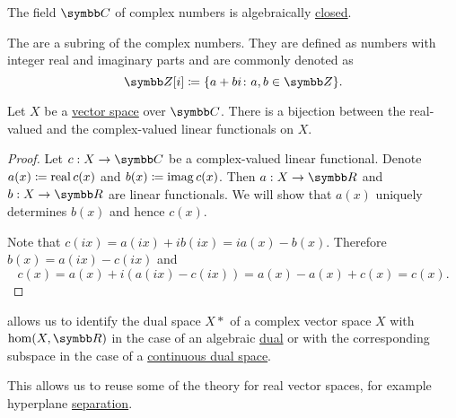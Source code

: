 \begin{theorem}\label{thm:fundamental_theorem_of_algebra}
  The field \( \BC \) of complex numbers is algebraically \hyperref[def:algebraically_closed_field]{closed}.
\end{theorem}

\begin{definition}\label{def:gaussian_integers}
  The  are a subring of the complex numbers. They are defined as numbers with integer real and imaginary parts and are commonly denoted as
  \begin{equation*}
    \BZ[i] \coloneqq \{ a + bi \colon a, b \in \BZ \}.
  \end{equation*}
\end{definition}

\begin{theorem}\label{thm:linear_functionals_over_c}
  Let \( X \) be a \hyperref[def:vector_space]{vector space} over \( \BC \). There is a bijection between the real-valued and the complex-valued linear functionals on \( X \).
\end{theorem}
\begin{proof}
  Let \( c: X \to \BC \) be a complex-valued linear functional. Denote \( a(x) \coloneqq \operatorname{real} c(x) \) and \( b(x) \coloneqq \operatorname{imag} c(x) \). Then \( a: X \to \BR \) and \( b: X \to \BR \) are linear functionals. We will show that \( a(x) \) uniquely determines \( b(x) \) and hence \( c(x) \).

  Note that \( c(ix) = a(ix) + i b(ix) = i a(x) - b(x) \). Therefore \( b(x) = a(ix) - c(ix) \) and
  \begin{equation*}
    c(x) = a(x) + i (a(ix) - c(ix)) = a(x) - a(x) + c(x) = c(x).
  \end{equation*}
\end{proof}

\begin{remark}\label{remark:linear_functionals_over_c}
   allows us to identify the dual space \( X* \) of a complex vector space \( X \) with \( \Hom(X, \BR) \) in the case of an algebraic \hyperref[def:dual_vector_space]{dual} or with the corresponding subspace in the case of a \hyperref[def:continuous_dual_space]{continuous dual space}.

  This allows us to reuse some of the theory for real vector spaces, for example hyperplane \hyperref[def:hyperplane_separation]{separation}.
\end{remark}
